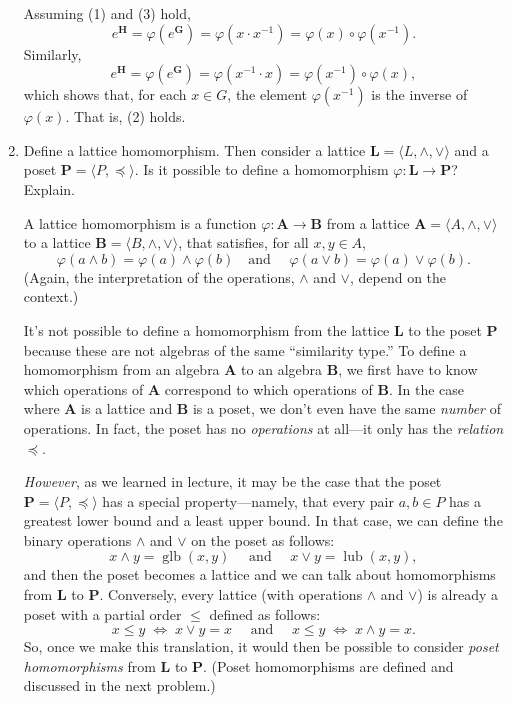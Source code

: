 \documentclass[12pt,reqno]{amsart}
\newcommand{\bL}{\ensuremath{\mathbf{L}}}
\newcommand{\bP}{\ensuremath{\mathbf{P}}}
\newcommand{\bA}{\ensuremath{\mathbf{A}}}
\newcommand{\bB}{\ensuremath{\mathbf{B}}}
\newcommand{\bG}{\ensuremath{\mathbf{G}}}
\newcommand{\bH}{\ensuremath{\mathbf{H}}}
\newcommand{\meet}{\ensuremath{\wedge}}
\newcommand{\<}{\ensuremath{\langle}}
\renewcommand{\>}{\ensuremath{\rangle}}
\newcommand{\join}{\ensuremath{\vee}}
\newcommand{\glb}{\operatorname{glb}}
\newcommand{\lub}{\operatorname{lub}}
\begin{document}
\begin{enumerate}[{\bf 1.}]
\medskip


\noindent
Assuming (1) and (3) hold,
\[
e^{\bH} = \varphi(e^{\bG}) = 
\varphi(x\cdot x^{-1}) = 
\varphi(x)\circ \varphi(x^{-1}).
\]
Similarly, 
\[
e^{\bH} = \varphi(e^{\bG}) = 
\varphi(x^{-1}\cdot x) = 
\varphi(x^{-1}) \circ \varphi(x),
\]
which shows that, for each $x\in G$, the element $\varphi(x^{-1})$ is the
inverse of $\varphi(x)$.  That is, (2) holds.

\bigskip

\item
Define a lattice homomorphism.
Then consider a lattice $\bL = \<L, \meet, \join\>$ and a poset $\bP = \<P, \preccurlyeq\>$.
Is it possible to define a homomorphism $\varphi: \bL \rightarrow \bP$?  Explain.

\medskip
{} 
A lattice  homomorphism is a function 
$\varphi: \bA \rightarrow  \bB$
from a lattice $\bA = \<A, \meet, \join\>$ to a
lattice $\bB = \<B, \meet, \join\>$,
that satisfies, for all $x, y \in A$, 
\[
\varphi(a\meet b)
=\varphi(a)\meet \varphi(b) 
\quad \text{
and }
\quad
\varphi(a\join b)
=\varphi(a) \join \varphi(b).
\]
(Again, the interpretation of the operations, $\meet$ and $\join$, depend on the
context.)

\medskip
It's not possible to define a homomorphism from the lattice $\bL$ to the poset
$\bP$ because these are not algebras of the same ``similarity type.''  To define
a homomorphism from an algebra $\bA$ to an algebra $\bB$, we first have to know
which operations of $\bA$ correspond to which operations of $\bB$.  
In the case where $\bA$ is a lattice and $\bB$ is a poset, we don't even have
the same \emph{number} of operations. In fact, the poset has no \emph{operations} at
all---it only has the \emph{relation} $\preccurlyeq$.

\emph{However}, as we learned in lecture, it may be the case that the poset
$\bP = \<P, \preccurlyeq\>$ has a special property---namely, that every pair 
$a, b \in P$ has a greatest lower bound and a least upper bound.  In that case,
we can define the binary operations $\meet$ and $\join$ on the poset as follows:
\[
x\meet y = \glb(x,y) \quad \text{ and } \quad x \join y = \lub(x,y),
\]
and then the poset becomes a lattice and we can talk about homomorphisms from
$\bL$ to $\bP$.
Conversely, every lattice (with operations $\meet$ and $\join$) is already a poset with
a partial order $\leq$ defined as follows:
\[
 x\leq y  \; \Longleftrightarrow \;  x\join y = x 
\quad \text{ and } \quad
x\leq y \; \Longleftrightarrow \;  x\meet y = x. 
\]
So, once we make this translation, it would then be possible to consider
\emph{poset homomorphisms} from $\bL$ to $\bP$.  (Poset
homomorphisms are defined and discussed in the next problem.)


\end{enumerate}
\end{document}
